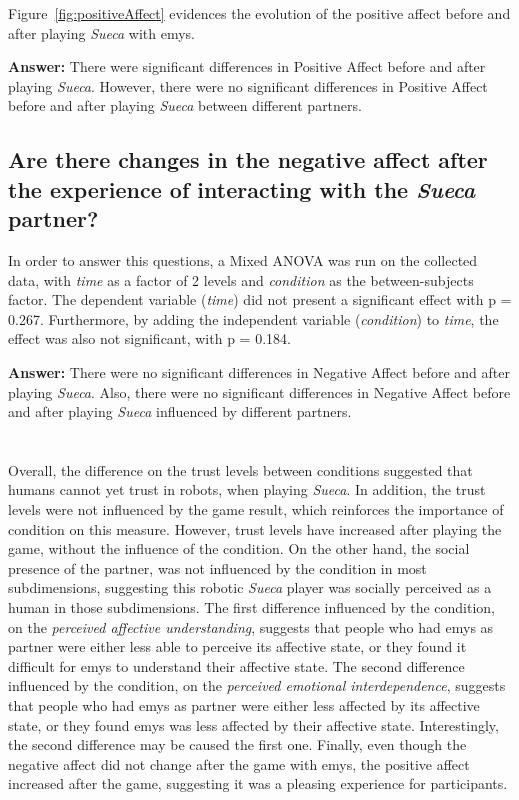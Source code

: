 Figure~\ref{fig:positiveAffect} evidences the evolution of the positive affect before and after playing \emph{Sueca} with \ac{emys}.

\textbf{Answer:} There were significant differences in Positive Affect before and after playing \emph{Sueca}.
However, there were no significant differences in Positive Affect before and after playing \emph{Sueca} between different partners.

\subsection*{Are there changes in the negative affect after the experience of interacting with the \emph{Sueca} partner?}
In order to answer this questions, a Mixed ANOVA was run on the collected data, with \emph{time} as a factor of 2 levels and \emph{condition} as the between-subjects factor.
The dependent variable (\emph{time}) did not present a significant effect with p = 0.267.
Furthermore, by adding the independent variable (\emph{condition}) to \emph{time}, the effect was also not significant, with p = 0.184.

\textbf{Answer:} There were no significant differences in Negative Affect before and after playing \emph{Sueca}.
Also, there were no significant differences in Negative Affect before and after playing \emph{Sueca} influenced by different partners.

\section*{\centering*}

Overall, the difference on the trust levels between conditions suggested that humans cannot yet trust in robots, when playing \emph{Sueca}.
In addition, the trust levels were not influenced by the game result, which reinforces the importance of condition on this measure.
However, trust levels have increased after playing the game, without the influence of the condition.
On the other hand, the social presence of the partner, was not influenced by the condition in most subdimensions, suggesting this robotic \emph{Sueca} player was socially perceived as a human in those subdimensions.
The first difference influenced by the condition, on the \emph{perceived affective understanding}, suggests that people who had \ac{emys} as partner were either less able to perceive its affective state, or they found it difficult for \ac{emys} to understand their affective state.
The second difference influenced by the condition, on the \emph{perceived emotional interdependence}, suggests that people who had \ac{emys} as partner were either less affected by its affective state, or they found \ac{emys} was less affected by their affective state.
Interestingly, the second difference may be caused the first one.
Finally, even though the negative affect did not change after the game with \ac{emys}, the positive affect increased after the game, suggesting it was a pleasing experience for participants.


\cleardoublepage
